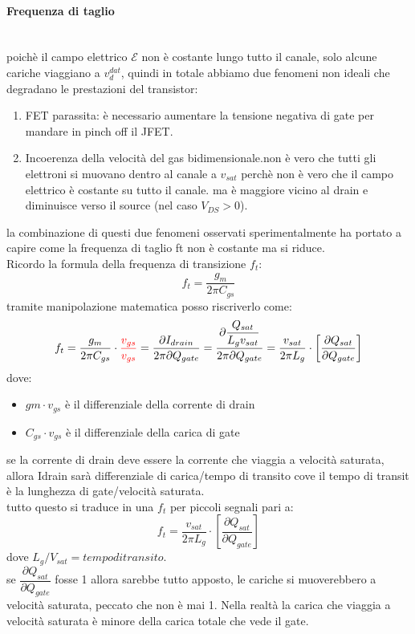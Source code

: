 \paragraph{Frequenza di taglio}\mbox{}\\
poichè il campo elettrico $\mathcal{E}$ non è costante lungo tutto il canale, solo alcune cariche viaggiano a $v_d^{dat}$, quindi in totale abbiamo due fenomeni non ideali che degradano le prestazioni del transistor:
\begin{enumerate}
    \item FET parassita: è necessario aumentare la tensione negativa di gate per mandare in pinch off il JFET.
    \item Incoerenza della velocità del gas bidimensionale.non è vero che tutti gli elettroni si muovano dentro al canale a $v_{sat}$ perchè non è vero che il campo elettrico è costante su tutto il canale. ma è maggiore vicino al drain e diminuisce verso il source (nel caso $V_{DS}>0$).\\
\end{enumerate}
la combinazione di questi due fenomeni osservati sperimentalmente ha portato a capire come la frequenza di taglio ft non è costante ma si riduce.\\
Ricordo la formula della frequenza di transizione $f_t$:
\begin{equation}
    f_t=\dfrac{g_m}{2\pi C_{gs}}
\end{equation}
tramite manipolazione matematica posso riscriverlo come:
\begin{equation}
    f_t=\dfrac{g_m}{2\pi C_{gs}}\cdot \color{red}\dfrac{v_{gs}}{v_{gs}} \color{black}=\dfrac{\partial I_{drain}}{2\pi \partial Q_{gate}}=\dfrac{\partial \dfrac{ Q_{sat}}{L_gv_{sat}}}{2\pi \partial Q_{gate}}=\dfrac{v_{sat}}{2\pi L_g}\cdot\left[ \dfrac{\partial Q_{sat}}{\partial Q_{gate}}\right]
\end{equation}
dove:
\begin{itemize}
    \item $gm \cdot v_{gs}$ è il differenziale della corrente di drain
    \item $C_{gs} \cdot v_{gs}$ è il differenziale della carica di gate
\end{itemize}
se la corrente di drain deve essere la corrente che viaggia a velocità saturata, allora Idrain sarà differenziale di carica/tempo di transito cove il tempo di transit è la lunghezza di gate/velocità saturata.\\

tutto questo si traduce in una $f_t$ per piccoli segnali pari a:
\begin{equation}
    f_t=\dfrac{v_{sat}}{2\pi L_g}\cdot\left[ \dfrac{\partial Q_{sat}}{\partial Q_{gate}}\right]
\end{equation}
dove $L_g/V_{sat}= tempo di transito$.\\
se $\dfrac{\partial Q_{sat}}{\partial Q_{gate}}$ fosse 1 allora sarebbe tutto apposto, le cariche si muoverebbero a velocità saturata, peccato che non è mai 1. Nella realtà la carica che viaggia a velocità saturata è minore della carica totale che vede il gate.\\


